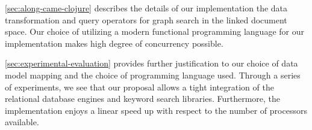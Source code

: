 		\cref{sec:along-came-clojure} describes the details of our implementation the data transformation and query operators for graph search in the linked document space.  Our choice of utilizing a modern functional programming language for our implementation makes high degree of concurrency possible.
		
		\cref{sec:experimental-evaluation} provides further justification to our choice of data model mapping and the choice of programming language used.  Through a series of experiments, we see that our proposal allows a tight integration of the relational database engines and keyword search libraries.  Furthermore, the implementation enjoys a linear speed up with respect to the number of processors available.